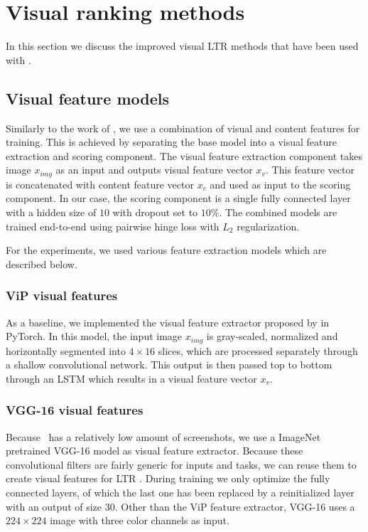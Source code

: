 
\section{Visual ranking methods}
In this section we discuss the improved visual \ac{LTR} methods that have been used with \datasetname.

\subsection{Visual feature models}
Similarly to the work of \citet{fan2017learning}, we use a combination of visual and content features for training. This is achieved by separating the base model into a visual feature extraction and scoring component. The visual feature extraction component takes image $x_{img}$ as an input and outputs visual feature vector $x_{v}$. This feature vector is concatenated with content feature vector $x_{c}$ and used as input to the scoring component. In our case, the scoring component is a single fully connected layer with a hidden size of $10$ with dropout set to $10\%$. The combined models are trained end-to-end using pairwise hinge loss with $L_2$ regularization. 

For the experiments, we used various feature extraction models which are described below.

\subsubsection{ViP visual features}
As a baseline, we implemented the visual feature extractor proposed by \citet{fan2017learning} in PyTorch. In this model, the input image $x_{img}$ is gray-scaled, normalized and horizontally segmented into $4\times16$ slices, which are processed separately through a shallow convolutional network. This output is then passed top to bottom through an LSTM which results in a visual feature vector $x_{v}$. 

\subsubsection{VGG-16 visual features}
Because \datasetname~has a relatively low amount of screenshots, we use a ImageNet pretrained VGG-16 \cite{simonyan2014very} model as visual feature extractor. Because these convolutional filters are fairly generic for inputs and tasks, we can reuse them to create visual features for LTR . During training we only optimize the fully connected layers, of which the last one has been replaced by a reinitialized layer with an output of size $30$.  Other than the ViP feature extractor, VGG-16 uses a $224\times224$ image with three color channels as input. 


